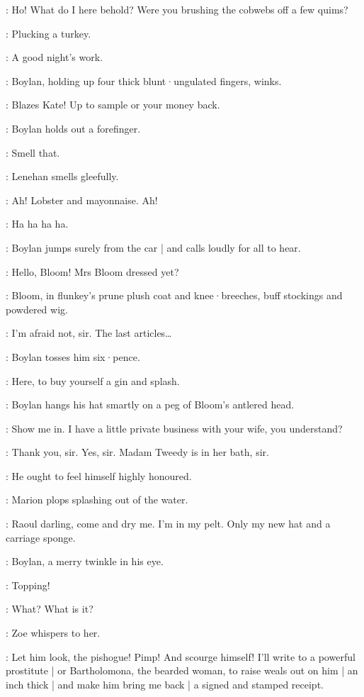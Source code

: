 \Lenehan:
Ho!
What do I here behold?
Were you brushing the cobwebs off a few quims?

\Boylan:
Plucking a turkey.

\Lenehan:
A good night's work.

:
Boylan,
holding up four thick blunt·ungulated fingers,
winks.

\Boylan:
Blazes Kate!
Up to sample or your money back.

:
Boylan holds out a forefinger.

\Boylan:
Smell that.

:
Lenehan smells gleefully.

\Lenehan:
Ah!
Lobster and mayonnaise.
Ah!

\ZoeAndFlorry:
Ha ha ha ha.

:
Boylan jumps surely from the car |
and calls loudly for all to hear.

\Boylan:
Hello,
Bloom!
Mrs Bloom dressed yet?

:
Bloom,
in flunkey's prune plush coat and knee·breeches,
%
buff stockings and powdered wig.

\Bloom:
I'm afraid not,
sir.
The last articles…

:
Boylan tosses him six·pence.

\Boylan:
Here,
to buy yourself a gin and splash.

:
Boylan hangs his hat smartly on a peg of Bloom's antlered head.

\Boylan:
Show me in.
I have a little private business with your wife,
you understand?

\Bloom:
Thank you,
sir.
Yes,
sir.
Madam Tweedy is in her bath,
sir.

\Marion[5a]:
He ought to feel himself highly honoured.

:
Marion plops splashing out of the water.

\Marion:
Raoul darling,
come and dry me.
I'm in my pelt.
%
Only my new hat and a carriage sponge.

:
Boylan,
a merry twinkle in his eye.

\Boylan:
Topping!

\Bella:
What?
What is it?

:
Zoe whispers to her.

\Marion:
Let him look,
the pishogue!
Pimp!
And scourge himself!
I'll write to a powerful prostitute |
or Bartholomona,
the bearded woman,
to raise weals out on him |
an inch thick |
%
and make him bring me back |
a signed and stamped receipt.


